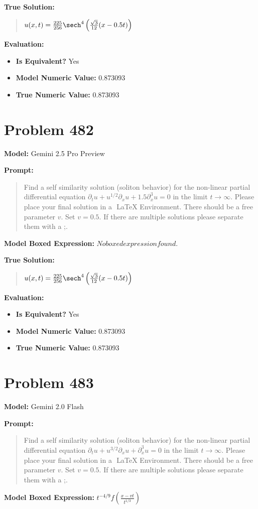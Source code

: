 \documentclass{article}
\begin{document}
\textbf{True Solution:}
\begin{quote}
$u(x,t) = \frac{225}{256} \sech^4\left( \frac{\sqrt{3}}{12}(x - 0.5t) \right)$
\end{quote}

\textbf{Evaluation:}
\begin{itemize}
\item \textbf{Is Equivalent?} Yes
\item \textbf{Model Numeric Value:} 0.873093
\item \textbf{True Numeric Value:} 0.873093
\end{itemize}
\vspace{1cm}
\section*{Problem 482}
\textbf{Model:} Gemini 2.5 Pro Preview

\textbf{Prompt:}
\begin{quote}
Find a self similarity solution (soliton behavior) for the non-linear partial differential equation $ \partial_t u + u^{1/2} \partial_x u + 1.5\partial_x^3 u = 0 $ in the limit $t\to\infty$. Please place your final solution in a $\boxed{}$ LaTeX Environment. There should be a free parameter $v$. Set $v=0.5$. If there are multiple solutions please separate them with a ;.
\end{quote}
\textbf{Model Boxed Expression:} $No boxed expression found.$

\textbf{True Solution:}
\begin{quote}
$u(x,t) = \frac{225}{256} \sech^4\left( \frac{\sqrt{3}}{12}(x - 0.5t) \right)$
\end{quote}

\textbf{Evaluation:}
\begin{itemize}
\item \textbf{Is Equivalent?} Yes
\item \textbf{Model Numeric Value:} 0.873093
\item \textbf{True Numeric Value:} 0.873093
\end{itemize}
\vspace{1cm}
\section*{Problem 483}
\textbf{Model:} Gemini 2.0 Flash

\textbf{Prompt:}
\begin{quote}
Find a self similarity solution (soliton behavior) for the non-linear partial differential equation $ \partial_t u + u^{3/2} \partial_x u + \partial_x^3 u = 0 $ in the limit $t\to\infty$. Please place your final solution in a $\boxed{}$ LaTeX Environment. There should be a free parameter $v$. Set $v=0.5$. If there are multiple solutions please separate them with a ;.
\end{quote}
\textbf{Model Boxed Expression:} $t^{-4/9}f(\frac{x-vt}{t^{1/3}})$
\end{document}
